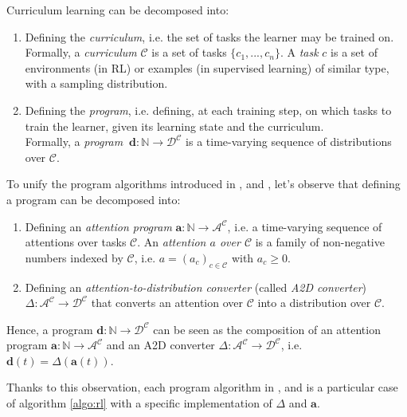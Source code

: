 \documentclass{article}
\begin{document}
Curriculum learning can be decomposed into:
\begin{enumerate}
\item Defining the \textit{curriculum}, i.e. the set of tasks the learner may be trained on. \\
Formally, a \textit{curriculum} \(\mathcal{C}\) is a set of tasks \(\{c_1, ..., c_n\}\). A \textit{task} $c$ is a set of environments (in RL) or examples (in supervised learning) of similar type, with a sampling distribution.
\item Defining the \textit{program}, i.e. defining, at each training step, on which tasks to train the learner, given its learning state and the curriculum. \\
Formally, a \textit{program} \footnotemark \(\ \textbf{d}:\mathbb{N}\rightarrow\mathcal{D}^\mathcal{C}\) is a time-varying sequence of distributions over \(\mathcal{C}\).
\end{enumerate}

To unify the program algorithms introduced in  \citep{matiisen2017teacher}, \citep{graves2017automated} and \citep{fournier2018}, let's observe that defining a program can be decomposed into:
\begin{enumerate}
    \item Defining an \textit{attention program} \(\textbf{a}:\mathbb{N}\rightarrow \mathcal{A}^\mathcal{C}\), i.e. a time-varying sequence of attentions over tasks \(\mathcal{C}\). An \textit{attention \(a\) over \(\mathcal{C}\)} is a family of non-negative numbers indexed by \(\mathcal{C}\), i.e. \(a = (a_{c})_{c\in\mathcal{C}}\) with \(a_c \geq 0\).
    \item Defining an \textit{attention-to-distribution converter} (called \textit{A2D converter}) \(\Delta:\mathcal{A}^\mathcal{C}\rightarrow\mathcal{D}^\mathcal{C}\) that converts an attention over \(\mathcal{C}\) into a distribution over \(\mathcal{C}\).
\end{enumerate}

Hence, a program \(\textbf{d}:\mathbb{N}\rightarrow\mathcal{D}^\mathcal{C}\) can be seen as the composition of an attention program \(\textbf{a}:\mathbb{N}\rightarrow \mathcal{A}^\mathcal{C}\) and an A2D converter \(\Delta:\mathcal{A}^\mathcal{C}\rightarrow\mathcal{D}^\mathcal{C}\), i.e. \(\textbf{d}(t) = \Delta(\textbf{a}(t))\).

Thanks to this observation, each program algorithm in \citep{matiisen2017teacher}, \citep{graves2017automated} and \citep{fournier2018} is a particular case of algorithm \ref{algo:rl} with a specific implementation of \(\Delta\) and \(\textbf{a}\).
\end{document}
